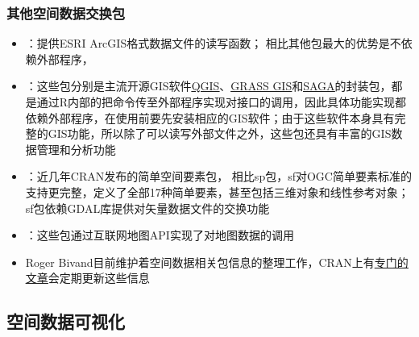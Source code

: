 \subsubsection{其他空间数据交换包}
\begin{frame}[t]{\subsecname}{\subsubsecname}
\begin{itemize} 
\item {}：提供ESRI ArcGIS格式数据文件的读写函数；
相比其他包最大的优势是不依赖外部程序，
\item {}：这些包分别是主流开源GIS软件\href{https://www.qgis.org/}{\uline{QGIS}}、\href{https://grass.osgeo.org/}{\uline{GRASS GIS}}和\href{http://www.saga-gis.org/}{\uline{SAGA}}的封装包，都是通过R内部的把命令传至外部程序实现对接口的调用，因此具体功能实现都依赖外部程序，在使用前要先安装相应的GIS软件；由于这些软件本身具有完整的GIS功能，所以除了可以读写外部文件之外，这些包还具有丰富的GIS数据管理和分析功能
\item {}：近几年CRAN发布的简单空间要素包，
相比sp包，sf对OGC简单要素标准的支持更完整，定义了全部17种简单要素，甚至包括三维对象和线性参考对象；sf包依赖GDAL库提供对矢量数据文件的交换功能
\item {}：这些包通过互联网地图API实现了对地图数据的调用
\item Roger Bivand目前维护着空间数据相关包信息的整理工作，CRAN上有\href{https://cran.r-project.org/web/views/Spatial.html}{\uline{专门的文章}}会定期更新这些信息
\end{itemize}

\end{frame}

\subsection{空间数据可视化}